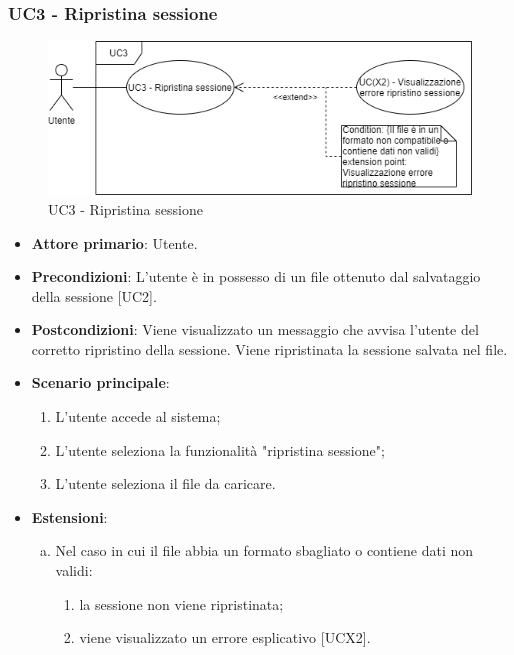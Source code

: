 \subsubsection{UC3 - Ripristina sessione}
\begin{figure}[h]
\includegraphics[width=\linewidth]{section/Images/UC3RipristinaSessione.png}
\centering
\caption{UC3 - Ripristina sessione}
\end{figure}
\begin{itemize}
	\item \textbf{Attore primario}: Utente.
	\item \textbf{Precondizioni}: L'utente è in possesso di un file ottenuto dal salvataggio della sessione [UC2].
	\item \textbf{Postcondizioni}: Viene visualizzato un messaggio che avvisa l'utente del corretto ripristino della sessione. Viene ripristinata la sessione salvata nel file.
	\item \textbf{Scenario principale}:
		\begin{enumerate}
			\item L'utente accede al sistema;
			\item L'utente seleziona la funzionalità "ripristina sessione";
			\item L'utente seleziona il file da caricare.
		\end{enumerate}
	\item \textbf{Estensioni}:
	\begin{enumerate}[(a)]
		\item Nel caso in cui il file abbia un formato sbagliato o contiene dati non validi:
		\begin{enumerate}[1.]
			\item la sessione non viene ripristinata;
			\item viene visualizzato un errore esplicativo [UCX2].
		\end{enumerate}
	\end{enumerate}
\end{itemize}